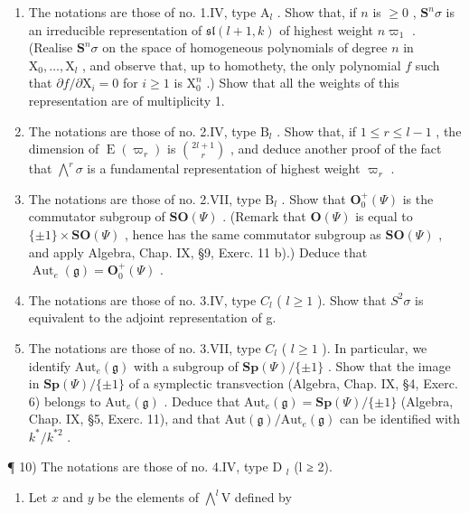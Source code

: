 \begin{enumerate}
\def\labelenumi{\arabic{enumi})}
\setcounter{enumi}{4}
\item
  The notations are those of no. 1.IV, type \(\mathrm{A}_l\) . Show that, if \(n\) is \(\geq 0\) , \(\mathbf{S}^n\sigma\) is an irreducible representation of \(\mathfrak{sl}(l + 1,k)\) of highest weight \(n\varpi_1\) . (Realise \(\mathbf{S}^n\sigma\) on the space of homogeneous polynomials of degree \(n\) in \(\mathrm{X}_0,\dots ,\mathrm{X}_l\) , and observe that, up to homothety, the only polynomial \(f\) such that \(\partial f / \partial \mathrm{X}_i = 0\) for \(i\geq 1\) is \(\mathrm{X}_0^n\) .) Show that all the weights of this representation are of multiplicity 1.
\item
  The notations are those of no. 2.IV, type \(\mathrm{B}_l\) . Show that, if \(1 \leq r \leq l - 1\) , the dimension of \(\operatorname{E}(\varpi_r)\) is \(\binom{2l + 1}{r}\) , and deduce another proof of the fact that \(\bigwedge^r \sigma\) is a fundamental representation of highest weight \(\varpi_r\) .
\item
  The notations are those of no. 2.VII, type \(\mathrm{B}_l\) . Show that \(\mathbf{O}_0^+ (\Psi)\) is the commutator subgroup of \(\mathbf{SO}(\Psi)\) . (Remark that \(\mathbf{O}(\Psi)\) is equal to \(\{\pm 1\} \times \mathbf{SO}(\Psi)\) , hence has the same commutator subgroup as \(\mathbf{SO}(\Psi)\) , and apply Algebra, Chap. IX, §9, Exerc. 11 b).) Deduce that \(\operatorname{Aut}_e(\mathfrak{g}) = \mathbf{O}_0^+ (\Psi)\) .
\item
  The notations are those of no. 3.IV, type \(C_{l}\) ( \(l \geq 1\) ). Show that \(S^{2}\sigma\) is equivalent to the adjoint representation of g.
\item
  The notations are those of no. 3.VII, type \(C_l\) ( \(l \geq 1\) ). In particular, we identify \(\mathrm{Aut}_e(\mathfrak{g})\) with a subgroup of \(\mathbf{Sp}(\varPsi)/\{\pm 1\}\) . Show that the image in \(\mathbf{Sp}(\varPsi)/\{\pm 1\}\) of a symplectic transvection (Algebra, Chap. IX, §4, Exerc. 6) belongs to \(\mathrm{Aut}_e(\mathfrak{g})\) . Deduce that \(\mathrm{Aut}_e(\mathfrak{g}) = \mathbf{Sp}(\varPsi)/\{\pm 1\}\) (Algebra, Chap. IX, §5, Exerc. 11), and that \(\mathrm{Aut}(\mathfrak{g})/\mathrm{Aut}_e(\mathfrak{g})\) can be identified with \(k^*/k^{*2}\) .
\end{enumerate}

¶ 10) The notations are those of no. 4.IV, type D \(_{l}\) (l ≥ 2).

\begin{enumerate}
\def\labelenumi{\alph{enumi})}
\tightlist
\item
  Let \(x\) and \(y\) be the elements of \(\bigwedge^{l} \mathrm{V}\) defined by
\end{enumerate}

